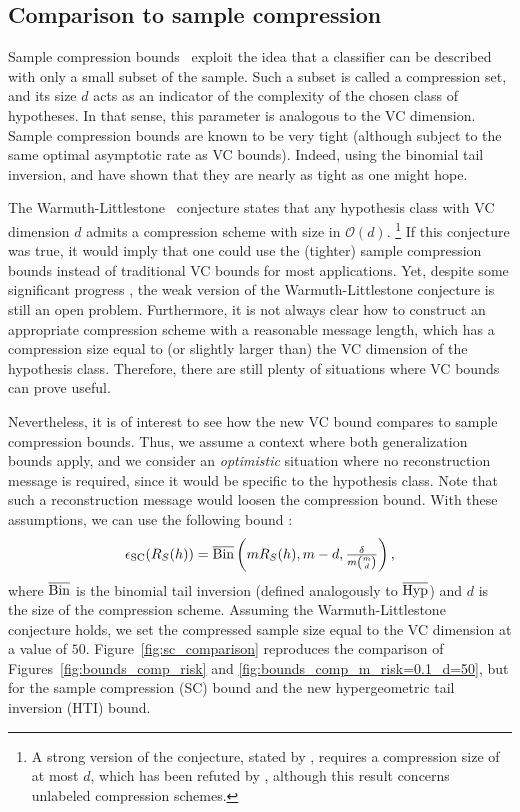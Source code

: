 \documentclass[twoside,11pt]{article}
\renewcommand{\O}{\mathscr{O}}
\newcommand{\pr}[1]{\left(#1\right)}
\newcommand{\BinInv}{\overline{\textnormal{Bin}}}
\newcommand{\HypInv}{\overline{\textnormal{Hyp}}}
\begin{document}



\subsection{Comparison to sample compression}
\label{ssec:sc_comparaison}

Sample compression bounds~\citep{floyd95sample} exploit the idea that a classifier can be described with only a small subset of the sample.
Such a subset is called a compression set, and its size $d$ acts as an indicator of the complexity of the chosen class of hypotheses.
In that sense, this parameter is analogous to the VC dimension.
Sample compression bounds are known to be very tight (although subject to the same optimal asymptotic rate as VC bounds).
Indeed, using the binomial tail inversion, \citet{langford05} and \citet{Laviolette09} have shown that they are nearly as tight as one might hope.

The Warmuth-Littlestone~\citep{floyd95sample} conjecture states that any hypothesis class with VC dimension $d$ admits a compression scheme with size in $\O(d)$.%
\footnote{A strong version of the conjecture, stated by \citet{kuzmin2007unlabeled}, requires a compression size of at most $d$, which has been refuted by \cite{palvolgyi2020unlabeled}, although this result concerns unlabeled compression schemes.}
If this conjecture was true, it would imply that one could use the (tighter) sample compression bounds instead of traditional VC bounds for most applications.
Yet, despite some significant progress \citep{moran16sample}, the weak version of the Warmuth-Littlestone conjecture is still an open problem.
Furthermore, it is not always clear how to construct an appropriate compression scheme with a reasonable message length, which has a compression size equal to (or slightly larger than) the VC dimension of the hypothesis class.
Therefore, there are still plenty of situations where VC bounds can prove useful.

Nevertheless, it is of interest to see how the new VC bound compares to sample compression bounds.
Thus, we assume a context where both generalization bounds apply, and we consider an \emph{optimistic} situation where no reconstruction message is required, since it would be specific to the hypothesis class.
Note that such a reconstruction message would loosen the compression bound.
With these assumptions, we can use the following bound \citep{langford05, Laviolette09}:
\begin{equation*}
    \epsilon_\textnormal{SC}(R_S(h)) = \BinInv\pr{mR_S(h), m-d,\textstyle \frac{\delta}{m \binom{m}{d}}},
\end{equation*}
where $\BinInv$ is the binomial tail inversion (defined analogously to $\HypInv$) and $d$ is the size of the compression scheme.
Assuming the Warmuth-Littlestone conjecture holds, we set the compressed sample size equal to the VC dimension at a value of $50$.
Figure~\ref{fig:sc_comparison} reproduces the comparison of Figures~\ref{fig:bounds_comp_risk} and \ref{fig:bounds_comp_m_risk=0.1_d=50}, but for the sample compression (SC) bound and the new hypergeometric tail inversion (HTI) bound.
\end{document}
